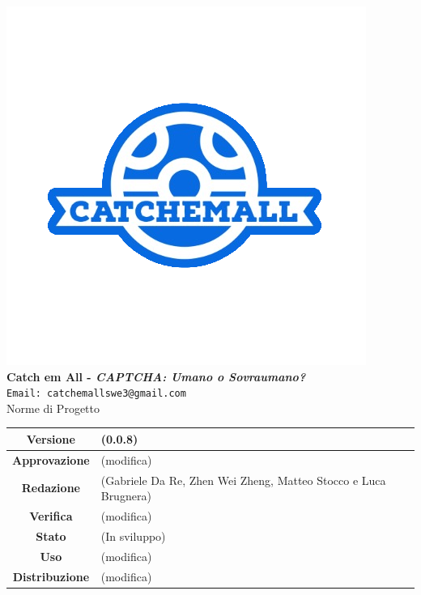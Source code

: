 \begin{titlepage}
\begin{center}
	\includegraphics[scale = 1.5]{img/logo.png}\\
	\bigskip
	\large \textbf{Catch em All - \textit{CAPTCHA: Umano o Sovraumano?}}\\
	\texttt{Email: catchemallswe3@gmail.com}\\
	\vfill
	{\fontsize{1.5cm}{0}\selectfont Norme di Progetto}\\
	\vfill
	\renewcommand\tabularxcolumn[1]{>{\Centering}m{#1}}
	\begin{tabularx}{\textwidth}{|c|X|}
		\hline
		\textbf{Versione} & (0.0.8)\\
		\hline
		\textbf{Approvazione} & (modifica)\\
		\hline
		\textbf{Redazione} & (Gabriele Da Re, Zhen Wei Zheng, Matteo Stocco e Luca Brugnera)\\
		\hline
		\textbf{Verifica} & (modifica)\\
		\hline
		\textbf{Stato} & (In sviluppo)\\
		\hline
		\textbf{Uso} & (modifica)\\
		\hline
		\textbf{Distribuzione} & (modifica)\\
		\hline
	\end{tabularx}
\end{center}
\end{titlepage}